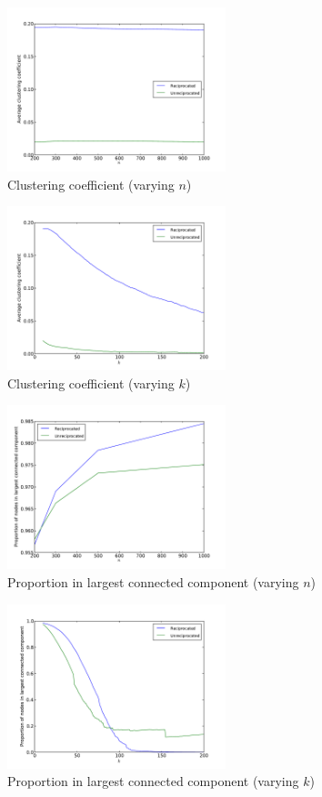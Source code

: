 \documentclass[conference]{IEEEtran}
\begin{document}
\begin{figure}[!t]
\centering
\includegraphics[width=2.5in]{average_clustering_n}          
\caption{Clustering coefficient (varying $n$)}
\label{fig_rur_cc_n}
\end{figure}

\begin{figure}[!t]
\centering
\includegraphics[width=2.5in]{average_clustering_k}      
\caption{Clustering coefficient (varying $k$)}
\label{fig_rur_cc_k}
\end{figure}

\begin{figure}[!t]
\centering
\includegraphics[width=2.5in]{proportion_largestcc_n}
\caption{Proportion in largest connected component (varying $n$)}
\label{fig_rur_lcc_n}
\end{figure}

\begin{figure}[!t]
\centering
\includegraphics[width=2.5in]{proportion_largestcc_k}
\caption{Proportion in largest connected component (varying $k$)}
\label{fig_rur_lcc_k}
\end{figure}
\end{document}
